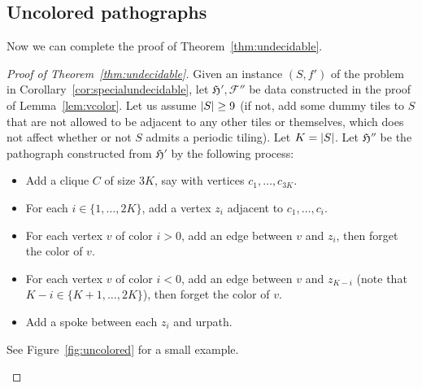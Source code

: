 \documentclass{article}
\renewcommand{\vert}[2]{\node[dot] (#1) at (#2) {};}
\newcommand{\alabvert}[4]{\node[dot, label={[label distance=-2pt] #4:{$#3$}}] (#1) at (#2) {};}
\newcommand{\edge}[2]{\draw (#1) -- (#2);}
\newcommand{\Fc}{\mathcal{F}}
\newcommand{\Hf}{\mathfrak{H}}
\DeclarePairedDelimiter{\abs}{\lvert}{\rvert}
\begin{document}
\subsection{Uncolored pathographs}

Now we can complete the proof of Theorem~\ref{thm:undecidable}.

\begin{proof}[Proof of Theorem~\ref{thm:undecidable}]
Given an instance $(S, f')$ of the problem in Corollary~\ref{cor:specialundecidable}, let $\Hf',\Fc''$ be data constructed in the proof of Lemma~\ref{lem:vcolor}. Let us assume $\abs{S}\ge 9$ (if not, add some dummy tiles to $S$ that are not allowed to be adjacent to any other tiles or themselves, which does not affect whether or not $S$ admits a periodic tiling). Let $K=\abs{S}$. Let $\Hf''$ be the pathograph constructed from $\Hf'$ by the following process:
\begin{itemize}
    \item Add a clique $C$ of size $3K$, say with vertices $c_1,\dots,c_{3K}$.
    \item For each $i\in \{1,\dots,2K\}$, add a vertex $z_i$ adjacent to $c_1,\dots,c_i$.
    \item For each vertex $v$ of color $i>0$, add an edge between $v$ and $z_i$, then forget the color of $v$.
    \item For each vertex $v$ of color $i<0$, add an edge between $v$ and $z_{K-i}$ (note that $K-i\in\{K+1,\dots,2K\}$), then forget the color of $v$.
    \item Add a spoke between each $z_i$ and urpath.
\end{itemize}
See Figure~\ref{fig:uncolored} for a small example.
\begin{figure}[htbp!]
    \centering
\end{figure}
\end{proof}
\end{document}
